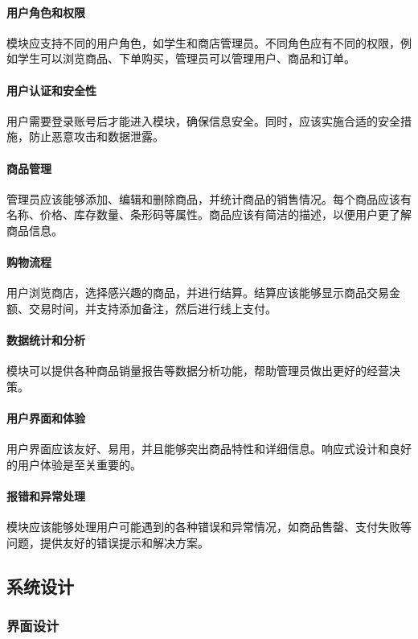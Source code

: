 \documentclass{article}
\begin{document}
\paragraph{用户角色和权限}
模块应支持不同的用户角色，如学生和商店管理员。不同角色应有不同的权限，例如学生可以浏览商品、下单购买，管理员可以管理用户、商品和订单。

\paragraph{用户认证和安全性}
用户需要登录账号后才能进入模块，确保信息安全。同时，应该实施合适的安全措施，防止恶意攻击和数据泄露。

\paragraph{商品管理}
管理员应该能够添加、编辑和删除商品，并统计商品的销售情况。每个商品应该有名称、价格、库存数量、条形码等属性。商品应该有简洁的描述，以便用户更了解商品信息。

\paragraph{购物流程}
用户浏览商店，选择感兴趣的商品，并进行结算。结算应该能够显示商品交易金额、交易时间，并支持添加备注，然后进行线上支付。

\paragraph{数据统计和分析}
模块可以提供各种商品销量报告等数据分析功能，帮助管理员做出更好的经营决策。

\paragraph{用户界面和体验}
用户界面应该友好、易用，并且能够突出商品特性和详细信息。响应式设计和良好的用户体验是至关重要的。

\paragraph{报错和异常处理}
模块应该能够处理用户可能遇到的各种错误和异常情况，如商品售罄、支付失败等问题，提供友好的错误提示和解决方案。

\subsection{系统设计}
\subsubsection{界面设计}
\end{document}
